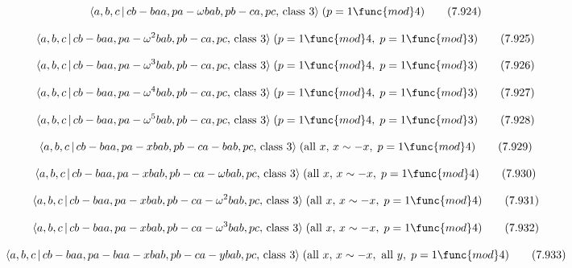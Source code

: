 \documentclass[10pt]{article}
\begin{document}
\begin{equation}
\langle a,b,c\,|\,cb-baa,pa-\omega bab,pb-ca,pc,\,\text{class }3\rangle
\;(p=1\func{mod}4)  \tag{7.924}
\end{equation}

\begin{equation}
\langle a,b,c\,|\,cb-baa,pa-\omega ^{2}bab,pb-ca,pc,\,\text{class }3\rangle
\;(p=1\func{mod}4,\;p=1\func{mod}3)  \tag{7.925}
\end{equation}

\begin{equation}
\langle a,b,c\,|\,cb-baa,pa-\omega ^{3}bab,pb-ca,pc,\,\text{class }3\rangle
\;(p=1\func{mod}4,\;p=1\func{mod}3)  \tag{7.926}
\end{equation}

\begin{equation}
\langle a,b,c\,|\,cb-baa,pa-\omega ^{4}bab,pb-ca,pc,\,\text{class }3\rangle
\;(p=1\func{mod}4,\;p=1\func{mod}3)  \tag{7.927}
\end{equation}

\begin{equation}
\langle a,b,c\,|\,cb-baa,pa-\omega ^{5}bab,pb-ca,pc,\,\text{class }3\rangle
\;(p=1\func{mod}4,\;p=1\func{mod}3)  \tag{7.928}
\end{equation}

\begin{equation}
\langle a,b,c\,|\,cb-baa,pa-xbab,pb-ca-bab,pc,\,\text{class }3\rangle \;(%
\text{all }x,\,x\sim -x,\;p=1\func{mod}4)  \tag{7.929}
\end{equation}

\begin{equation}
\langle a,b,c\,|\,cb-baa,pa-xbab,pb-ca-\omega bab,pc,\,\text{class }3\rangle
\;(\text{all }x,\,x\sim -x,\;p=1\func{mod}4)  \tag{7.930}
\end{equation}

\begin{equation}
\langle a,b,c\,|\,cb-baa,pa-xbab,pb-ca-\omega ^{2}bab,pc,\,\text{class }%
3\rangle \;(\text{all }x,\,x\sim -x,\;p=1\func{mod}4)  \tag{7.931}
\end{equation}

\begin{equation}
\langle a,b,c\,|\,cb-baa,pa-xbab,pb-ca-\omega ^{3}bab,pc,\,\text{class }%
3\rangle \;(\text{all }x,\,x\sim -x,\;p=1\func{mod}4)  \tag{7.932}
\end{equation}

\begin{equation}
\langle a,b,c\,|\,cb-baa,pa-baa-xbab,pb-ca-ybab,pc,\,\text{class }3\rangle
\;(\text{all }x,\,x\sim -x,\text{ all }y,\;p=1\func{mod}4)  \tag{7.933}
\end{equation}
\end{document}
